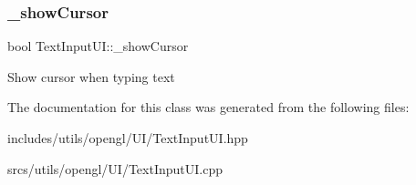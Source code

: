 \subsubsection{\texorpdfstring{\+\_\+show\+Cursor}{\_showCursor}}
{\footnotesize\ttfamily bool Text\+Input\+U\+I\+::\+\_\+show\+Cursor\hspace{0.3cm}{\ttfamily [protected]}}

Show cursor when typing text 

The documentation for this class was generated from the following files\+:\begin{DoxyCompactItemize}
\item 
includes/utils/opengl/\+U\+I/Text\+Input\+U\+I.\+hpp\item 
srcs/utils/opengl/\+U\+I/Text\+Input\+U\+I.\+cpp\end{DoxyCompactItemize}
